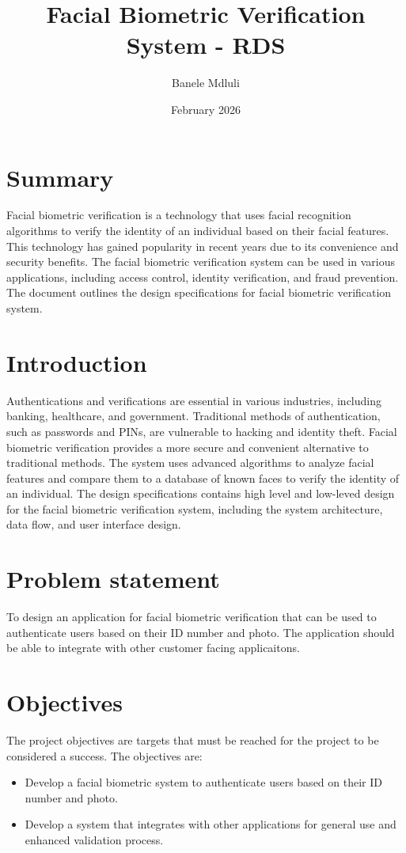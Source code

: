 \documentclass{article}
\title{Facial Biometric Verification System  - RDS}
\author{Banele Mdluli}
\date{February 2026}
\begin{document}
\maketitle
\newpage
\section{Summary}
Facial biometric verification is a technology that uses facial recognition algorithms to verify the identity of an individual based on their facial features.
This technology has gained popularity in recent years due to its convenience and security benefits. The facial biometric verification system can be used in various 
applications, including access control, identity verification, and fraud prevention. The document outlines the design specifications for facial biometric verification system.


\section{Introduction}
Authentications and verifications are essential in various industries, including banking, healthcare, and government. Traditional methods of authentication, 
such as passwords and PINs, are vulnerable to hacking and identity theft. 
Facial biometric verification provides a more secure and convenient alternative to traditional methods. The system uses advanced algorithms to analyze facial 
features and compare them to a database of known faces to verify the identity of an individual. The design specifications contains high level and low-leved design for 
the facial biometric verification system, including the system architecture, data flow, and user interface design.


\section{Problem statement}
To design an application for facial biometric verification that can be used to authenticate users based on their ID number and photo. The application should be able to integrate
with other customer facing applicaitons.

\section{Objectives}
The project objectives are targets that must be reached for the project to be considered a success. The objectives are:
\begin{itemize}
    \item Develop a facial biometric system to authenticate users based on their ID number and photo.
    \item Develop a system that integrates with other applications for general use and enhanced validation process.
\end{itemize}
\end{document}
